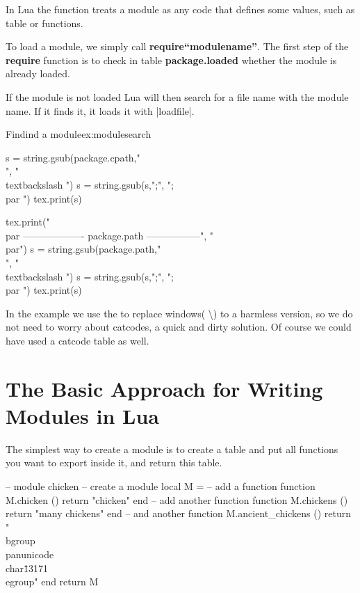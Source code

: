 In Lua the  function treats a module as any code that defines some values, such as table or functions. 

To load  a module, we simply call \textbf{require\enquote{modulename}}. The first step of the \textbf{require} function is to check in table \textbf{package.loaded} whether the module is already loaded.

If the module is not loaded Lua will then search for a file name with the module name. If it finds it, it loads it with |loadfile|. 


\begin{texexample}{Findind a module}{ex:modulesearch}
\begin{luacode*}
s = string.gsub(package.cpath,"\\", "\\textbackslash ")
s = string.gsub(s,";", ";\\par ")
tex.print(s)

tex.print("\\par ------------------- package.path -----------------", "\\par")
s = string.gsub(package.path,"\\", "\\textbackslash ")
s = string.gsub(s,";", ";\\par ")
tex.print(s)
\end{luacode*}
\end{texexample}


In the example we use the  to replace windows( \textbackslash) to a harmless version, so we do not need to worry about catcodes, a quick and dirty solution.  Of course we could have used a catcode table as well.

\section{The Basic Approach for Writing Modules in Lua}

The simplest way to create a module is to create a table and put all functions you want to export inside it, and return this table.

\begin{lualisting}
-- module chicken
-- create a module
local M = {}
-- add a function
function M.chicken ()
  return "chicken"
end
-- add another function
function M.chickens ()
  return "many chickens" 
end
-- and another
function M.ancient_chickens ()
  return "\\bgroup\\panunicode\\char\"13171 \\egroup"
end
return M
\end{lualisting}

